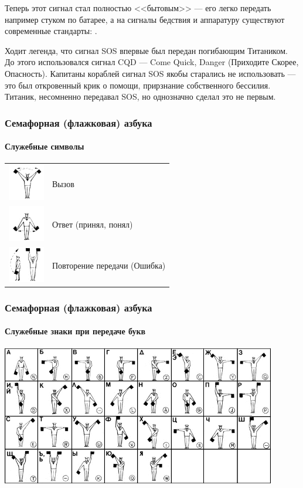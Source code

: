 Теперь этот сигнал стал полностью <<бытовым>> --- его легко передать например стуком по батарее, а на сигналы бедствия и аппаратуру существуют современные стандарты: .

Ходит легенда, что сигнал SOS впервые был передан погибающим Титаником. До этого использовался сигнал CQD --- Come Quick, Danger (Приходите Скорее, Опасность). Капитаны кораблей сигнал SOS якобы старались не использовать --- это был откровенный крик о помощи, прирзнание собственного бессилия. Титаник, несомненно передавал SOS, но однозначно сделал это не первым.

\begin{frame}
    \frametitle{Семафорная (флажковая) азбука}
    \framesubtitle{Служебные символы}
    
    \begin{center}
        \begin{tabular}{cl}
            \includegraphics[height=45pt]{fig/semaphoreVyzov}   & Вызов \\
            \includegraphics[height=45pt]{fig/semaphoreOtvet}   & Ответ (принял, понял) \\
            \includegraphics[height=45pt]{fig/semaphorePovtor}  & Повторение передачи (Ошибка)
        \end{tabular}
    \end{center}
\end{frame}

\begin{frame}
    \frametitle{Семафорная (флажковая) азбука}
    \framesubtitle{Служебные знаки при передаче букв}
    
    \begin{center}
        \includegraphics[width=0.9\textwidth]{fig/semaphore}
    \end{center}
\end{frame}

